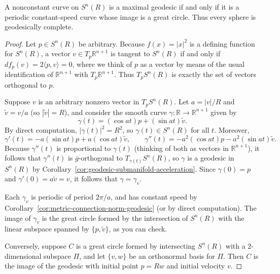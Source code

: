 \begin{proposition}
\label{prop:maximal-geodesic-sphere}

A nonconstant curve on $S^n(R)$ is a maximal geodesic if and only if it is a periodic constant-speed curve whose image is a great circle. Thus every sphere is geodesically complete.

\begin{proof}
Let $p \in S^n(R)$ be arbitrary. Because $f(x) = |x|^2$ is a defining function for $S^n(R)$, a vector $v \in T_p\mathbb{R}^{n+1}$ is tangent to $S^n(R)$ if and only if $df_p(v) = 2\langle p,v \rangle = 0$, where we think of $p$ as a vector by means of the usual identification of $\mathbb{R}^{n+1}$ with $T_p\mathbb{R}^{n+1}$. Thus $T_pS^n(R)$ is exactly the set of vectors orthogonal to $p$.

Suppose $v$ is an arbitrary nonzero vector in $T_pS^n(R)$. Let $a = |v|/R$ and $\tilde{v} = v/a$ (so $|\tilde{v}| = R$), and consider the smooth curve $\gamma: \mathbb{R} \to \mathbb{R}^{n+1}$ given by
\[
\gamma(t) = (\cos at)p + (\sin at)\tilde{v}.
\]
By direct computation, $|\gamma(t)|^2 = R^2$, so $\gamma(t) \in S^n(R)$ for all $t$. Moreover,
\[
\gamma'(t) = -a(\sin at)p + a(\cos at)\tilde{v}, \qquad
\gamma''(t) = -a^2(\cos at)p - a^2(\sin at)\tilde{v}.
\]
Because $\gamma''(t)$ is proportional to $\gamma(t)$ (thinking of both as vectors in $\mathbb{R}^{n+1}$), it follows that $\gamma''(t)$ is $\overline{g}$-orthogonal to $T_{\gamma(t)}S^n(R)$, so $\gamma$ is a geodesic in $S^n(R)$ by Corollary~\ref{cor:geodesic-submanifold-acceleration}. Since $\gamma(0) = p$ and $\gamma'(0) = a\tilde{v} = v$, it follows that $\gamma = \gamma_v$.

Each $\gamma_v$ is periodic of period $2\pi/a$, and has constant speed by Corollary~\ref{cor:metric-connection-norm-geodesic} (or by direct computation). The image of $\gamma_v$ is the great circle formed by the intersection of $S^n(R)$ with the linear subspace spanned by $\{p, \tilde{v}\}$, as you can check.

Conversely, suppose $C$ is a great circle formed by intersecting $S^n(R)$ with a 2-dimensional subspace $\Pi$, and let $\{v, w\}$ be an orthonormal basis for $\Pi$. Then $C$ is the image of the geodesic with initial point $p = Rw$ and initial velocity $v$.
\end{proof}
\end{proposition}


